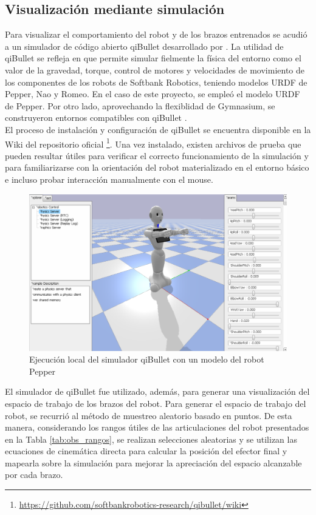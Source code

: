 \subsection{Visualización mediante simulación}

Para visualizar el comportamiento del robot y de los brazos entrenados se acudió a un simulador de código abierto qiBullet desarrollado por \textcite{busy2019qibullet}. La utilidad de qiBullet se refleja en que permite simular fielmente la física del entorno como el valor de la gravedad, torque, control de motores y velocidades de movimiento de los componentes de los robots de Softbank Robotics, teniendo modelos URDF de Pepper, Nao y Romeo. En el caso de este proyecto, se empleó el modelo URDF de Pepper. Por otro lado, aprovechando la flexiblidad de Gymnasium, se construyeron entornos compatibles con qiBullet \parencite{towers2024gymnasium}.\\

El proceso de instalación y configuración de qiBullet se encuentra disponible en la Wiki del repositorio oficial \footnote{\url{https://github.com/softbankrobotics-research/qibullet/wiki}}. Una vez instalado, existen archivos de prueba que pueden resultar útiles para verificar el correcto funcionamiento de la simulación y para familiarizarse con la orientación del robot materializado en el entorno básico e incluso probar interacción manualmente con el mouse. \\

\begin{figure}[h!]
	\centering
	\includegraphics[width=350pt]{images/metodologia/qibullet}
	\caption{Ejecución local del simulador qiBullet con un modelo del robot Pepper}
	\label{fig:qibullet}
\end{figure}

El simulador de qiBullet fue utilizado, además, para generar una visualización del espacio de trabajo de los brazos del robot. Para generar el espacio de trabajo del robot, se recurrió al método de muestreo aleatorio basado en puntos. De esta manera, considerando los rangos útiles de las articulaciones del robot presentados en la Tabla \ref{tab:obs_rangos}, se realizan selecciones aleatorias y se utilizan las ecuaciones de cinemática directa para calcular la posición del efector final y mapearla sobre la simulación para mejorar la apreciación del espacio alcanzable por cada brazo.\\

